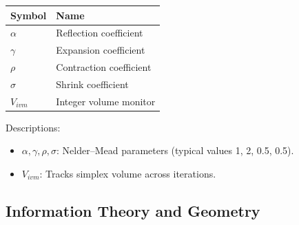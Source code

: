 \documentclass[
  10pt,
]{article}
\providecommand{\tightlist}{%
  \setlength{\itemsep}{0pt}\setlength{\parskip}{0pt}}
\begin{document}
\begin{longtable}[]{@{}ll@{}}
\toprule
Symbol & Name\tabularnewline
\midrule
\endhead
\(\alpha\) & Reflection coefficient\tabularnewline
\(\gamma\) & Expansion coefficient\tabularnewline
\(\rho\) & Contraction coefficient\tabularnewline
\(\sigma\) & Shrink coefficient\tabularnewline
\(V_{ivm}\) & Integer volume monitor\tabularnewline
\bottomrule
\end{longtable}

Descriptions:

\begin{itemize}
\tightlist
\item
  \(\alpha,\gamma,\rho,\sigma\): Nelder--Mead parameters (typical values
  1, 2, 0.5, 0.5).
\item
  \(V_{ivm}\): Tracks simplex volume across iterations.
\end{itemize}

\hypertarget{information-theory-and-geometry}{%
\subsection{Information Theory and
Geometry}\label{information-theory-and-geometry}}
\end{document}
